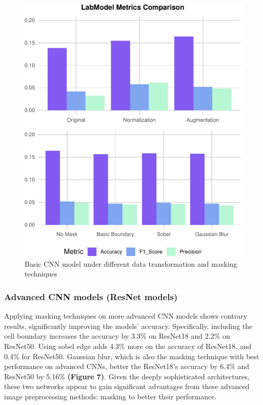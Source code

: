 \documentclass[letterpaper,9pt,twocolumn,twoside,]{pinp}
\begin{document}
\begin{figure}[h]

{\centering \includegraphics{Image02_final_report_files/figure-latex/unnamed-chunk-2-1} 

}

\caption{Basic CNN model under different data transformation and masking techniques}\label{fig:unnamed-chunk-2}
\end{figure}

\hypertarget{advanced-cnn-models-resnet-models}{%
\subsubsection{Advanced CNN models (ResNet
models)}\label{advanced-cnn-models-resnet-models}}

Applying masking techniques on more advanced CNN models shows contrary
results, significantly improving the models' accuracy. Specifically,
including the cell boundary increases the accuracy by 3.3\% on ResNet18
and 2.2\% on ResNet50. Using sobel edge adds 4.3\% more on the accuracy
of ResNet18, and 0.4\% for ResNet50. Gaussian blur, which is also the
masking technique with best performance on advanced CNNs, better the
ResNet18's accuracy by 6.4\% and ResNet50 by 5.16\% \textbf{(Figure 7)}.
Given the deeply sophisticated architectures, these two networks appear
to gain significant advantages from these advanced image preprocessing
methods: masking to better their performance.
\end{document}

